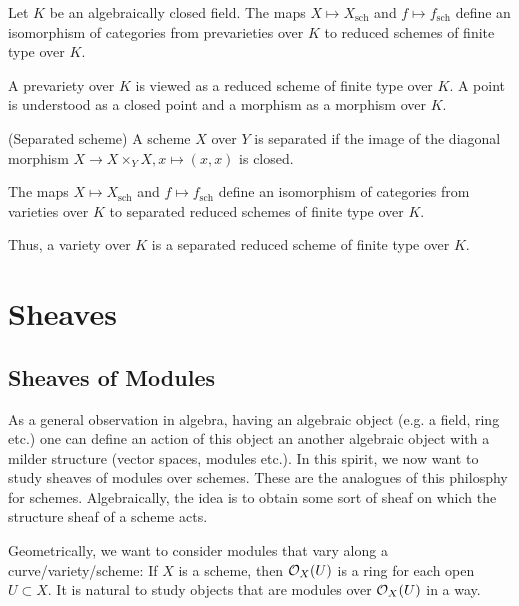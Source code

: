 \documentclass[a4paper,11pt]{article}
\begin{document}
				\begin{prop}
					Let $K$ be an algebraically closed field. The maps $X\mapsto X_\mathrm{sch}$ and $f\mapsto f_\mathrm{sch}$ define an isomorphism of categories from prevarieties over $K$ to reduced schemes of finite type over $K$.
				\end{prop}

				A prevariety over $K$ is viewed as a reduced scheme of finite type over $K$. A point is understood as a closed point and a morphism as a morphism over $K$.

				\begin{defi}(Separated scheme)
					A scheme $X$ over $Y$ is separated if the image of the diagonal morphism $X\rightarrow X\times_YX,x\mapsto(x,x)$ is closed.
				\end{defi}

				\begin{cor}
					The maps $X\mapsto X_\mathrm{sch}$ and $f\mapsto f_\mathrm{sch}$ define an isomorphism of categories from varieties over $K$ to separated reduced schemes of finite type over $K$.
				\end{cor}

				Thus, a variety over $K $ is a separated reduced scheme of finite type over $K$.
				
		
		

	\section{Sheaves}

		\subsection{Sheaves of Modules}

			As a general observation in algebra, having an algebraic object (e.g. a field, ring etc.) one can define an action of this object an another algebraic object with a milder structure (vector spaces, modules etc.). In this spirit, we now want to study sheaves of modules over schemes. These are the analogues of this philosphy for schemes. Algebraically, the idea is to obtain some sort of sheaf on which the structure sheaf of a scheme acts.

			Geometrically, we want to consider modules that vary along a curve/variety/scheme: If $X$ is a scheme, then $\mathcal{O}_X(U)$ is a ring for each open $U\subset X$. It is natural to study objects that are modules over $\mathcal{O}_X(U)$ in a  way.
\end{document}
